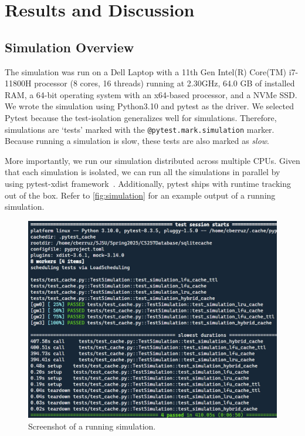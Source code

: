 
\section{Results and Discussion}
\subsection{Simulation Overview}
The simulation was run
on a Dell Laptop with a 11th Gen Intel(R) Core(TM) i7-11800H processor (8 cores, 16 threads)
running at 2.30GHz, 64.0 GB of installed RAM,
a 64-bit operating system with an x64-based processor, and a NVMe SSD.
We wrote the simulation
using Python3.10 and pytest as the driver.
We selected Pytest because the test-isolation generalizes
well for simulations. Therefore, simulations
are `tests' marked with the \texttt{@pytest.mark.simulation}
marker. Because running a simulation is slow,
these tests are also marked as \textit{slow}.

More importantly, we run our simulation
distributed across multiple CPUs. Given that
each simulation is isolated, we can run
all the simulations in parallel
by using pytest-xdist framework~\cite{pytestXdist}.
Additionally, pytest ships with runtime
tracking out of the box.
Refer to \autoref{fig:simulation}
for an example output of a running simulation.

\begin{figure}[!htp]
    \centering
    \includegraphics[width=\linewidth]{images/simulation_running_example.png}
    \caption{Screenshot of a running simulation.}
    \label{fig:simulation}
\end{figure}

